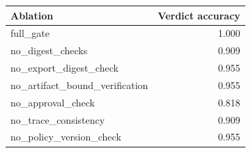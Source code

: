 \begin{tabular}{lr}
\toprule
Ablation & Verdict accuracy \\
\midrule
full\_gate & 1.000 \\
no\_digest\_checks & 0.909 \\
no\_export\_digest\_check & 0.955 \\
no\_artifact\_bound\_verification & 0.955 \\
no\_approval\_check & 0.818 \\
no\_trace\_consistency & 0.909 \\
no\_policy\_version\_check & 0.955 \\
\bottomrule
\end{tabular}
